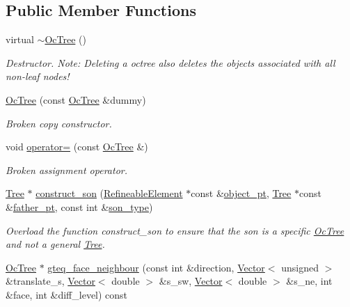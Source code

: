 \subsection*{Public Member Functions}
\begin{DoxyCompactItemize}
\item 
virtual \hyperlink{classoomph_1_1OcTree_a5c7bf77c8700898c428dacbdff6b334c}{$\sim$\+Oc\+Tree} ()
\begin{DoxyCompactList}\small\item\em Destructor. Note\+: Deleting a octree also deletes the objects associated with all non-\/leaf nodes! \end{DoxyCompactList}\item 
\hyperlink{classoomph_1_1OcTree_af9ead3a5abe10fff53b45e1a6b4adb97}{Oc\+Tree} (const \hyperlink{classoomph_1_1OcTree}{Oc\+Tree} \&dummy)
\begin{DoxyCompactList}\small\item\em Broken copy constructor. \end{DoxyCompactList}\item 
void \hyperlink{classoomph_1_1OcTree_ad17a3abb1a8d3f980f781f7b4e131e88}{operator=} (const \hyperlink{classoomph_1_1OcTree}{Oc\+Tree} \&)
\begin{DoxyCompactList}\small\item\em Broken assignment operator. \end{DoxyCompactList}\item 
\hyperlink{classoomph_1_1Tree}{Tree} $\ast$ \hyperlink{classoomph_1_1OcTree_a2f894bab3cbde60d810de0ee43a9f023}{construct\+\_\+son} (\hyperlink{classoomph_1_1RefineableElement}{Refineable\+Element} $\ast$const \&\hyperlink{classoomph_1_1Tree_a2f2eeb0f1dd161f696cccc652974ff4c}{object\+\_\+pt}, \hyperlink{classoomph_1_1Tree}{Tree} $\ast$const \&\hyperlink{classoomph_1_1Tree_a5f8444ddeda272b70669b8bbe929708a}{father\+\_\+pt}, const int \&\hyperlink{classoomph_1_1Tree_a7537f8fe7c896d2220eb2da03567b34d}{son\+\_\+type})
\begin{DoxyCompactList}\small\item\em Overload the function construct\+\_\+son to ensure that the son is a specific \hyperlink{classoomph_1_1OcTree}{Oc\+Tree} and not a general \hyperlink{classoomph_1_1Tree}{Tree}. \end{DoxyCompactList}\item 
\hyperlink{classoomph_1_1OcTree}{Oc\+Tree} $\ast$ \hyperlink{classoomph_1_1OcTree_a80a25fc3fbfa7bbfdea7b02ab98e13fb}{gteq\+\_\+face\+\_\+neighbour} (const int \&direction, \hyperlink{classoomph_1_1Vector}{Vector}$<$ unsigned $>$ \&translate\+\_\+s, \hyperlink{classoomph_1_1Vector}{Vector}$<$ double $>$ \&s\+\_\+sw, \hyperlink{classoomph_1_1Vector}{Vector}$<$ double $>$ \&s\+\_\+ne, int \&face, int \&diff\+\_\+level) const

\end{DoxyCompactItemize}
